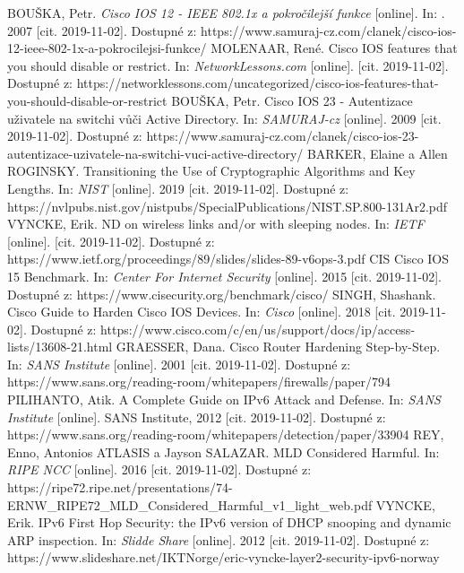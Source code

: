 \begin{literatura}{99}
BOUŠKA, Petr. \textit{Cisco IOS 12 - IEEE 802.1x a pokročilejší funkce} [online]. In: . 2007 [cit. 2019-11-02]. Dostupné z: https://www.samuraj-cz.com/clanek/cisco-ios-12-ieee-802-1x-a-pokrocilejsi-funkce/
MOLENAAR, René. Cisco IOS features that you should disable or restrict. In: \textit{NetworkLessons.com} [online]. [cit. 2019-11-02]. Dostupné z: https://networklessons.com/uncategorized/cisco-ios-features-that-you-should-disable-or-restrict
BOUŠKA, Petr. Cisco IOS 23 - Autentizace uživatele na switchi vůči Active Directory. In: \textit{SAMURAJ-cz} [online]. 2009 [cit. 2019-11-02]. Dostupné z: https://www.samuraj-cz.com/clanek/cisco-ios-23-autentizace-uzivatele-na-switchi-vuci-active-directory/
BARKER, Elaine a Allen ROGINSKY. Transitioning the Use of Cryptographic Algorithms and Key Lengths. In: \textit{NIST} [online]. 2019 [cit. 2019-11-02]. Dostupné z: https://nvlpubs.nist.gov/nistpubs/SpecialPublications/NIST.SP.800-131Ar2.pdf
VYNCKE, Erik. ND on wireless links and/or with sleeping nodes. In: \textit{IETF} [online]. [cit. 2019-11-02]. Dostupné z: https://www.ietf.org/proceedings/89/slides/slides-89-v6ops-3.pdf
CIS Cisco IOS 15 Benchmark. In: \textit{Center For Internet Security} [online]. 2015 [cit. 2019-11-02]. Dostupné z: https://www.cisecurity.org/benchmark/cisco/
SINGH, Shashank. Cisco Guide to Harden Cisco IOS Devices. In: \textit{Cisco} [online]. 2018 [cit. 2019-11-02]. Dostupné z: https://www.cisco.com/c/en/us/support/docs/ip/access-lists/13608-21.html
GRAESSER, Dana. Cisco Router Hardening Step-by-Step. In: \textit{SANS Institute} [online]. 2001 [cit. 2019-11-02]. Dostupné z: https://www.sans.org/reading-room/whitepapers/firewalls/paper/794
PILIHANTO, Atik. A Complete Guide on IPv6 Attack and Defense. In: \textit{SANS Institute} [online]. SANS Institute, 2012 [cit. 2019-11-02]. Dostupné z: https://www.sans.org/reading-room/whitepapers/detection/paper/33904
REY, Enno, Antonios ATLASIS a Jayson SALAZAR. MLD Considered Harmful. In: \textit{RIPE NCC} [online]. 2016 [cit. 2019-11-02]. Dostupné z: https://ripe72.ripe.net/presentations/74-ERNW\_RIPE72\_MLD\_Considered\_Harmful\_v1\_light\_web.pdf
VYNCKE, Erik. IPv6 First Hop Security: the IPv6 version of DHCP snooping and dynamic ARP inspection. In: \textit{Slidde Share} [online]. 2012 [cit. 2019-11-02]. Dostupné z: https://www.slideshare.net/IKTNorge/eric-vyncke-layer2-security-ipv6-norway

\end{literatura}
